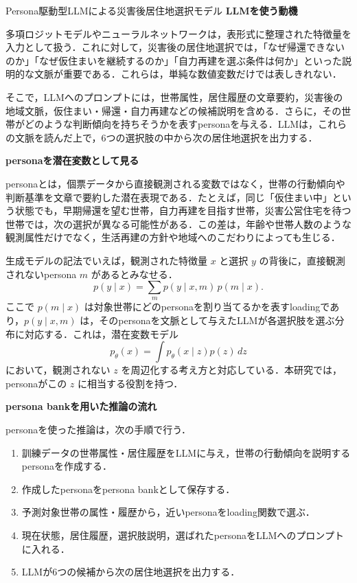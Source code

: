 \begin{column}{Persona駆動型LLMによる災害後居住地選択モデル}
\medskip
\noindent
\textbf{LLMを使う動機}

多項ロジットモデルやニューラルネットワークは，表形式に整理された特徴量を入力として扱う．これに対して，災害後の居住地選択では，「なぜ帰還できないのか」「なぜ仮住まいを継続するのか」「自力再建を選ぶ条件は何か」といった説明的な文脈が重要である．これらは，単純な数値変数だけでは表しきれない．

そこで，LLMへのプロンプトには，世帯属性，居住履歴の文章要約，災害後の地域文脈，仮住まい・帰還・自力再建などの候補説明を含める．さらに，その世帯がどのような判断傾向を持ちそうかを表すpersonaを与える．LLMは，これらの文脈を読んだ上で，6つの選択肢の中から次の居住地選択を出力する．

\medskip
\noindent
\textbf{personaを潜在変数として見る}

personaとは，個票データから直接観測される変数ではなく，世帯の行動傾向や判断基準を文章で要約した潜在表現である．たとえば，同じ「仮住まい中」という状態でも，早期帰還を望む世帯，自力再建を目指す世帯，災害公営住宅を待つ世帯では，次の選択が異なる可能性がある．この差は，年齢や世帯人数のような観測属性だけでなく，生活再建の方針や地域へのこだわりによっても生じる．

生成モデルの記法でいえば，観測された特徴量 \(x\) と選択 \(y\) の背後に，直接観測されないpersona \(m\) があるとみなせる．
\begin{equation}
p(y\mid x)
=
\sum_m p(y\mid x,m)\,p(m\mid x).
\end{equation}
ここで \(p(m\mid x)\) は対象世帯にどのpersonaを割り当てるかを表すloadingであり，\(p(y\mid x,m)\) は，そのpersonaを文脈として与えたLLMが各選択肢を選ぶ分布に対応する．これは，潜在変数モデル
\begin{equation}
p_\theta(x)=\int p_\theta(x\mid z)p(z)\,dz
\end{equation}
において，観測されない \(z\) を周辺化する考え方と対応している．本研究では，personaがこの \(z\) に相当する役割を持つ．

\medskip
\noindent
\textbf{persona bankを用いた推論の流れ}

personaを使った推論は，次の手順で行う．

\begin{enumerate}
\item 訓練データの世帯属性・居住履歴をLLMに与え，世帯の行動傾向を説明するpersonaを作成する．
\item 作成したpersonaをpersona bankとして保存する．
\item 予測対象世帯の属性・履歴から，近いpersonaをloading関数で選ぶ．
\item 現在状態，居住履歴，選択肢説明，選ばれたpersonaをLLMへのプロンプトに入れる．
\item LLMが6つの候補から次の居住地選択を出力する．
\end{enumerate}


\end{column}
